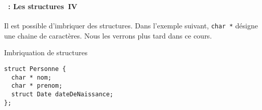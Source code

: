 \begin{frame}[containsverbatim]
  \frametitle{\secname}
  \framesubtitle{\subsecname~: Les structures~IV} 

  Il est possible d'imbriquer des structures. Dans l'exemple suivant, \verb|char *| désigne une chaine de caractères.
  Nous les verrons plus tard dans ce cours.
  \vspace{0.5cm}
  \begin{exampleblock}{Imbriquation de structures}
    \begin{verbatim}
struct Personne {
  char * nom;
  char * prenom;
  struct Date dateDeNaissance;
};\end{verbatim}
  \end{exampleblock}
\end{frame}


